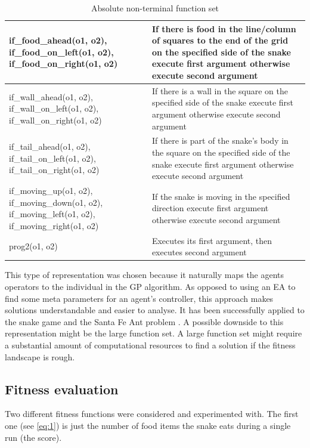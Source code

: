 \documentclass[12pt,a4paper]{article}
\begin{document}
	\begin{table}[h!]
		\centering
		\begin{tabu} to \textwidth {|X[3,l]|X[5,l]|}
			\hline
			if\_food\_ahead(o1, o2), if\_food\_on\_left(o1, o2), if\_food\_on\_right(o1, o2) & If there is food in the line/column of squares to the end of the grid on the specified side of the snake execute first argument otherwise execute second argument\\  
			\hline
			
			if\_wall\_ahead(o1, o2), if\_wall\_on\_left(o1, o2), if\_wall\_on\_right(o1, o2) & If there is a wall in the square on the specified side of the snake execute first argument otherwise execute second argument\\  
			\hline
			
			if\_tail\_ahead(o1, o2), if\_tail\_on\_left(o1, o2), if\_tail\_on\_right(o1, o2) & If there is part of the snake's body in the square on the specified side of the snake execute first argument otherwise execute second argument\\  
			\hline
			
			if\_moving\_up(o1, o2), if\_moving\_down(o1, o2), if\_moving\_left(o1, o2), if\_moving\_right(o1, o2) & If the snake is moving in the specified direction execute first argument otherwise execute second argument\\  
			\hline
			
			prog2(o1, o2) & Executes its first argument, then executes second argument \\   
			\hline
		\end{tabu}
		
		\caption{Absolute non-terminal function set}
		\label{table:absolute-non-terminals}
	\end{table}
	
	This type of representation was chosen because it naturally maps the agents operators to the individual in the GP algorithm. As opposed to using an EA to find some meta parameters for an agent's controller, this approach makes solutions understandable and easier to analyse. It has been successfully applied to the snake game \cite{ehlis_application_2000} and the Santa Fe Ant problem \cite{koza_genetic_1992}. A possible downside to this representation might be the large function set. A large function set might require a substantial amount of computational resources to find a solution if the fitness landscape is rough.
	
	\subsection{Fitness evaluation}
	Two different fitness functions were considered and experimented with. The first one (see \autoref{eq:1}) is just the number of food items the snake eats during a single run (the score). 
	
\end{document}
